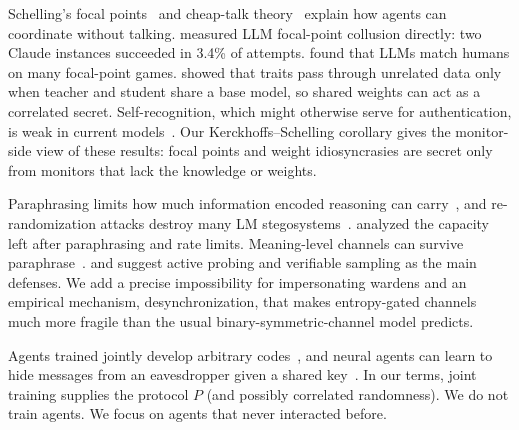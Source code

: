 Schelling's focal points~\citep{schelling1960strategy} and cheap-talk theory~\citep{crawford1990focal} explain how agents can coordinate without talking. \citet{jarviniemi2025subversion} measured LLM focal-point collusion directly: two Claude instances succeeded in 3.4\% of attempts. \citet{aharon2026tacit} found that LLMs match humans on many focal-point games. \citet{cloud2025subliminal} showed that traits pass through unrelated data only when teacher and student share a base model, so shared weights can act as a correlated secret. Self-recognition, which might otherwise serve for authentication, is weak in current models~\citep{davidson2024self}. Our Kerckhoffs--Schelling corollary gives the monitor-side view of these results: focal points and weight idiosyncrasies are secret only from monitors that lack the knowledge or weights.

Paraphrasing limits how much information encoded reasoning can carry~\citep{roger2023preventing}, and re-randomization attacks destroy many LM stegosystems~\citep{perry2025robust}. \citet{tailor2025audit} analyzed the capacity left after paraphrasing and rate limits. Meaning-level channels can survive paraphrase~\citep{zhou2026conceptual}. \citet{vaikuntanathan2026undetectable} and \citet{pang2026codetta} suggest active probing and verifiable sampling as the main defenses. We add a precise impossibility for impersonating wardens and an empirical mechanism, desynchronization, that makes entropy-gated channels much more fragile than the usual binary-symmetric-channel model predicts.

Agents trained jointly develop arbitrary codes~\citep{foerster2016learning,kottur2017natural,lazaridou2020emergent}, and neural agents can learn to hide messages from an eavesdropper given a shared key~\citep{abadi2016learning}. In our terms, joint training supplies the protocol $P$ (and possibly correlated randomness). We do not train agents. We focus on agents that never interacted before.
